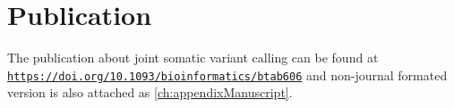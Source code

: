 \section{Publication}
The publication about joint somatic variant calling can be found at \href{https://doi.org/10.1093/bioinformatics/btab606}{\nolinkurl{https://doi.org/10.1093/bioinformatics/btab606}} and non-journal formated version is also attached as \autoref{ch:appendixManuscript}.